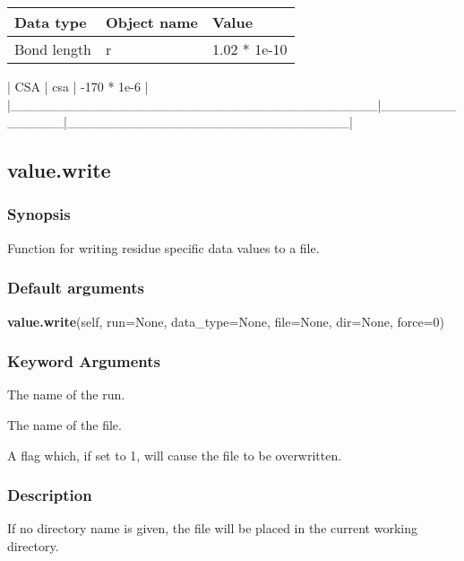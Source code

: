 \begin{center}
\begin{tabular}{lll}
\toprule
Data type & Object name & Value \\
\midrule
 Bond length                            &  r             &  1.02 * 1e-10                  \\
\bottomrule
\end{tabular}
\end{center}

| CSA                                   | csa          | -170 * 1e-6                  |
|\_\_\_\_\_\_\_\_\_\_\_\_\_\_\_\_\_\_\_\_\_\_\_\_\_\_\_\_\_\_\_\_\_\_\_\_\_\_\_|\_\_\_\_\_\_\_\_\_\_\_\_\_\_|\_\_\_\_\_\_\_\_\_\_\_\_\_\_\_\_\_\_\_\_\_\_\_\_\_\_\_\_\_\_|


\newpage

\subsection{value.write}


\subsubsection{Synopsis}

Function for writing residue specific data values to a file.

\subsubsection{Default arguments}

\textsf{\textbf{value.write}(self, run=None, data\_type=None, file=None, dir=None, force=0)}


\subsubsection{Keyword Arguments}

  The name of the run.

  The name of the file.

  A flag which, if set to 1, will cause the file to be overwritten.

\subsubsection{Description}

If no directory name is given, the file will be placed in the current working directory.

